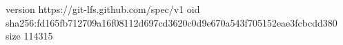 version https://git-lfs.github.com/spec/v1
oid sha256:fd165fb712709a16f08112d697cd3620c0d9e670a543f705152eae3fcbcdd380
size 114315
